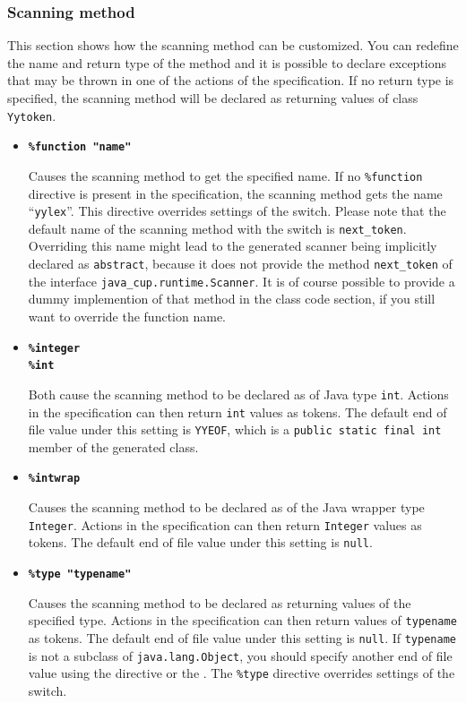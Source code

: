 \documentclass[11pt]{scrartcl}
\newcommand{\bl}{\latex{\symbol{123}}\html{\{}}
\newcommand{\br}{\latex{\symbol{125}}\html{\}}}
\begin{document}
\subsubsection{Scanning method\label{ScanningMethod}}
This section shows how the scanning method can be customized. You can redefine
the name and return type of the method and it is possible to declare
exceptions that may be thrown in one of the actions of the specification.
If no return type is specified, the scanning method will be declared as
returning values of class \texttt{Yytoken}.
\begin{itemize}
\item
{\bf \texttt{\%function "name"}}

Causes the scanning method to get the specified name. If no \texttt{\%function}
directive is present in the specification, the scanning method gets the
name ``\texttt{yylex}''. This directive overrides settings of the 
\texttt{} switch. Please note that the default name
of the scanning method with the \texttt{} switch is
\texttt{next\_token}. Overriding this name might lead to the generated scanner
being implicitly declared as \texttt{abstract}, because it does not provide
the method \texttt{next\_token} of the interface \texttt{java\_cup.runtime.Scanner}.
It is of course possible to provide a dummy implemention of that method
in the class code section, if you still want to override the function name.
 
\item
{\bf \texttt{\%integer}}\\
{\bf \texttt{\%int}}

Both cause the scanning method to be declared as of Java type \texttt{int}.
Actions in the specification can then return \texttt{int} values as tokens.
The default end of file value under this setting is \texttt{YYEOF}, which is a \texttt{public
static final int} member of the generated class.
 
\item
{\bf \texttt{\%intwrap}}

Causes the scanning method to be declared as of the Java wrapper type
\texttt{Integer}. Actions in the specification can then return \texttt{Integer}
values as tokens. The default end of file value under this setting is \texttt{null}.
 
\item
{\bf \texttt{\%type "typename"}}

Causes the scanning method to be declared as returning values of the specified type.
Actions in the specification can then return values of \texttt{typename}
as tokens. The default end of file value under this setting is \texttt{null}.
If \texttt{typename} is not a subclass of \texttt{java.lang.Object},
you should specify another end of file value using the
\htmlref{\texttt{\%eofval\bl} \texttt{...} \texttt{\%eofval\br}}{eofval}
directive or the . 
The \texttt{\%type} directive overrides settings of the 
\texttt{} switch.
 

\end{itemize}
\end{document}
